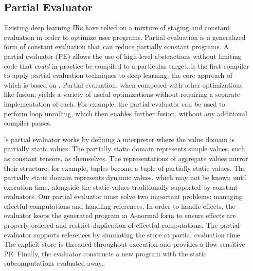 \subsection{Partial Evaluator}
\label{sec:partial_eval}
Existing deep learning IRs have relied on
  a mixture of staging and constant evaluation
  in order to optimize user programs.
Partial evaluation is a generalized form of constant
  evaluation that can reduce partially constant
  programs.
A partial evaluator (PE) allows the use of high-level abstractions
  without limiting code that \textit{could} in practice be
  compiled to a particular target.
\relay is the first compiler to apply partial evaluation
  techniques to deep learning, the
  core approach of which is based on \cite{pe_ref}.
Partial evaluation, when composed with other
  optimizations like fusion, yields a variety
  of useful optimizations without requiring
  a separate implementation of each.
For example, the partial evaluator can be used to perform
  loop unrolling, which then enables further fusion,
  without any additional compiler passes.

\relay's partial evaluator works by defining a interpreter
  where the value domain is partially static values.
The partially static domain represents simple values,
  such as constant tensors, as themselves.
The representations
  of aggregate values mirror their structure; for example,
  tuples become a tuple of partially static values.
The partially static domain represents dynamic values,
  which may not be known until execution time,
  alongside the static values traditionally supported by
  constant evaluators.
Our partial evaluator must solve two important problems:
  managing effectful computations and handling references.
In order to handle effects, the evaluator keeps the generated
  program in A-normal form to ensure effects are properly ordered
  and restrict duplication of effectful computations.
The partial evaluator supports references by
  simulating the store at partial evaluation time.
The explicit store is threaded throughout execution
  and provides a flow-sensitive PE.
Finally, the evaluator constructs a new program with
  the static subcomputations evaluated away.

